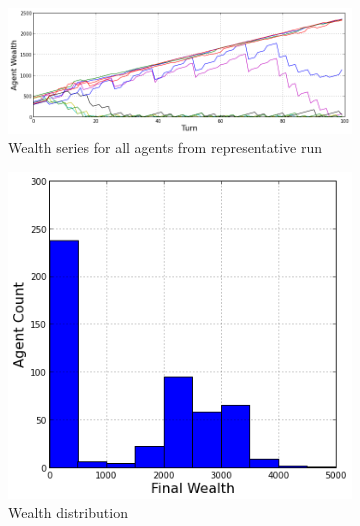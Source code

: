 \documentclass{article}
\begin{document}
\begin{figure}[h!]
	\centering
	\begin{subfigure}{\textwidth}
		\includegraphics[width=\textwidth]{Graphics/Exp3SampleRun}
		\caption{Wealth series for all agents from representative run}
	\end{subfigure}

	\centering
	\begin{subfigure}{0.49\textwidth}
		\includegraphics[width=\textwidth]{Graphics/Exp3WealthDistribution}
		\caption{Wealth distribution}
	\end{subfigure}
	\begin{subfigure}{0.49\textwidth}

\end{subfigure}
\end{figure}
\end{document}

